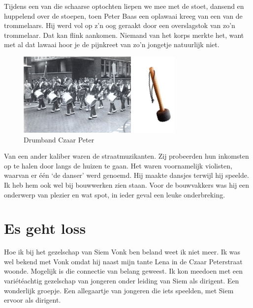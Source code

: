 \documentclass[10pt,twoside, openright]{memoir}
\begin{document}
Tijdens een van die schaarse optochten liepen we mee met de stoet, dansend en huppelend over de stoepen, toen Peter Baas een oplawaai kreeg van een van de trommelaars. Hij werd vol op z’n oog geraakt door een overslagstok van zo’n trommelaar. 
Dat kan flink aankomen. Niemand van het korps merkte het, want met al dat lawaai hoor je de pijnkreet van zo’n jongetje natuurlijk niet.

\begin{figure}
\includegraphics[width=\textwidth]{img/ch23/drumband2}
\caption*{\footnotesize Drumband Czaar Peter}
\end{figure}

Van een ander kaliber waren de straatmuzikanten. Zij probeerden hun inkomsten op te halen door langs de huizen te gaan. Het waren voornamelijk violisten, waarvan er één ‘de danser’ werd genoemd. Hij maakte dansjes terwijl hij speelde. Ik heb hem ook wel bij bouwwerken zien staan. Voor de bouwvakkers was hij een onderwerp van plezier en wat spot, in ieder geval een leuke onderbreking.


\chapter{Es geht loss} %
\label{cha:gehtloss}

Hoe ik bij het gezelschap van Siem Vonk ben beland weet ik niet meer. Ik was wel bekend met Vonk omdat hij naast mijn tante Lena in de Czaar Peterstraat woonde. Mogelijk is die connectie van belang geweest. Ik kon meedoen met een variétéachtig gezelschap van jongeren onder leiding van Siem als dirigent. Een wonderlijk groepje. Een allegaartje van jongeren die iets speelden, met Siem ervoor als dirigent.
\end{document}
